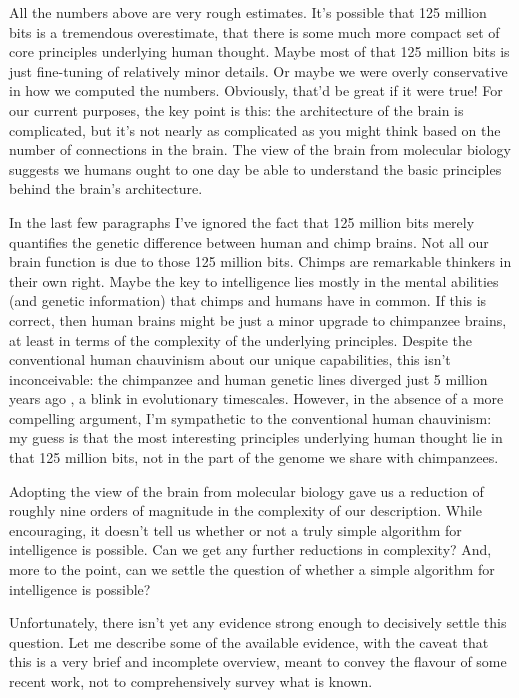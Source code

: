All the numbers above are very rough estimates. It's possible that 125 million bits is a tremendous overestimate, that there is some much more compact set of core principles underlying human thought. Maybe most of that 125 million bits is just fine-tuning of relatively minor details. Or maybe we were overly conservative in how we computed the numbers. Obviously, that'd be great if it were true! For our current purposes, the key point is this: the architecture of the brain is complicated, but it's not nearly as complicated as you might think based on the number of connections in the brain. The view of the brain from molecular biology suggests we humans ought to one day be able to understand the basic principles behind the brain's architecture.

In the last few paragraphs I've ignored the fact that 125 million bits merely quantifies the genetic difference between human and chimp brains. Not all our brain function is due to those 125 million bits. Chimps are remarkable thinkers in their own right. Maybe the key to intelligence lies mostly in the mental abilities (and genetic information) that chimps and humans have in common. If this is correct, then human brains might be just a minor upgrade to chimpanzee brains, at least in terms of the complexity of the underlying principles. Despite the conventional human chauvinism about our unique capabilities, this isn't inconceivable: the chimpanzee and human genetic lines diverged just 5 million years ago \cite{wikipediaChimpanzeehuman2019}, a blink in evolutionary timescales. However, in the absence of a more compelling argument, I'm sympathetic to the conventional human chauvinism: my guess is that the most interesting principles underlying human thought lie in that 125 million bits, not in the part of the genome we share with chimpanzees.

Adopting the view of the brain from molecular biology gave us a reduction of roughly nine orders of magnitude in the complexity of our description. While encouraging, it doesn't tell us whether or not a truly simple algorithm for intelligence is possible. Can we get any further reductions in complexity? And, more to the point, can we settle the question of whether a simple algorithm for intelligence is possible?

Unfortunately, there isn't yet any evidence strong enough to decisively settle this question. Let me describe some of the available evidence, with the caveat that this is a very brief and incomplete overview, meant to convey the flavour of some recent work, not to comprehensively survey what is known.

